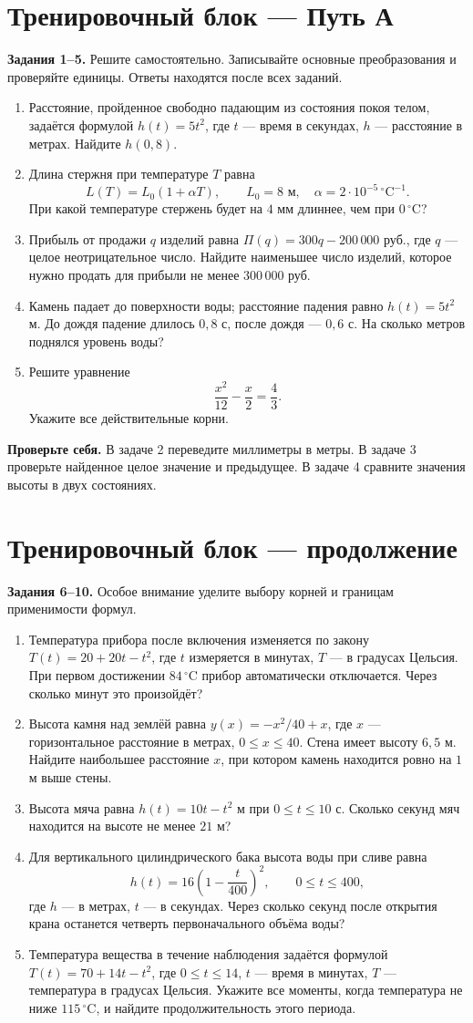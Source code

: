 \documentclass[a4paper,12pt]{article}
\newcommand{\heading}[1]{\section*{\color{darkaccent}#1}}
\begin{document}
\clearpage
\heading{Тренировочный блок — Путь А}
\textbf{Задания 1--5.} Решите самостоятельно. Записывайте основные преобразования и проверяйте единицы. Ответы находятся после всех заданий.
\begin{enumerate}
\item Расстояние, пройденное свободно падающим из состояния покоя телом, задаётся формулой $h(t)=5t^2$, где $t$ --- время в секундах, $h$ --- расстояние в метрах. Найдите $h(0,8)$.
\item Длина стержня при температуре $T$ равна
\[
L(T)=L_0(1+\alpha T),\qquad
L_0=8\text{ м},\quad \alpha=2\cdot10^{-5}\,{}^{\circ}\text{C}^{-1}.
\]
При какой температуре стержень будет на $4$ мм длиннее, чем при $0\,{}^{\circ}\text{C}$?
\item Прибыль от продажи $q$ изделий равна $\Pi(q)=300q-200\,000$ руб., где $q$ --- целое неотрицательное число. Найдите наименьшее число изделий, которое нужно продать для прибыли не менее $300\,000$ руб.
\item Камень падает до поверхности воды; расстояние падения равно $h(t)=5t^2$ м. До дождя падение длилось $0,8$ с, после дождя --- $0,6$ с. На сколько метров поднялся уровень воды?
\item Решите уравнение
\[
\frac{x^2}{12}-\frac{x}{2}=\frac43.
\]
Укажите все действительные корни.
\end{enumerate}
\vfill
\textbf{Проверьте себя.} В задаче 2 переведите миллиметры в метры. В задаче 3 проверьте найденное целое значение и предыдущее. В задаче 4 сравните значения высоты в двух состояниях.

\clearpage
\heading{Тренировочный блок — продолжение}
\textbf{Задания 6--10.} Особое внимание уделите выбору корней и границам применимости формул.
\begin{enumerate}[start=6]
\item Температура прибора после включения изменяется по закону $T(t)=20+20t-t^2$, где $t$ измеряется в минутах, $T$ --- в градусах Цельсия. При первом достижении $84\,{}^{\circ}\text{C}$ прибор автоматически отключается. Через сколько минут это произойдёт?
\item Высота камня над землёй равна $y(x)=-x^2/40+x$, где $x$ --- горизонтальное расстояние в метрах, $0\le x\le40$. Стена имеет высоту $6,5$ м. Найдите наибольшее расстояние $x$, при котором камень находится ровно на $1$ м выше стены.
\item Высота мяча равна $h(t)=10t-t^2$ м при $0\le t\le10$ с. Сколько секунд мяч находится на высоте не менее $21$ м?
\item Для вертикального цилиндрического бака высота воды при сливе равна
\[
h(t)=16\left(1-\frac{t}{400}\right)^2,\qquad 0\le t\le400,
\]
где $h$ --- в метрах, $t$ --- в секундах. Через сколько секунд после открытия крана останется четверть первоначального объёма воды?
\item Температура вещества в течение наблюдения задаётся формулой $T(t)=70+14t-t^2$, где $0\le t\le14$, $t$ --- время в минутах, $T$ --- температура в градусах Цельсия. Укажите все моменты, когда температура не ниже $115\,{}^{\circ}\text{C}$, и найдите продолжительность этого периода.
\end{enumerate}
\end{document}
